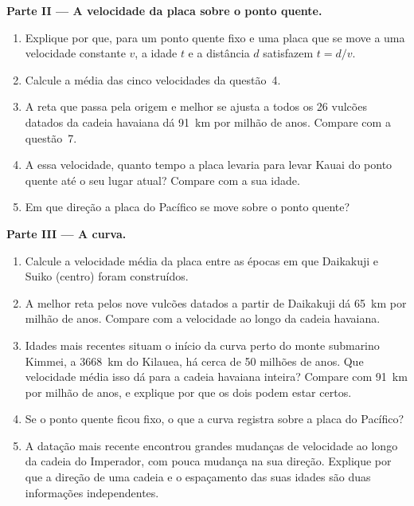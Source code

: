 \begin{problem}
\medskip
\noindent\textbf{Parte II --- A velocidade da placa sobre o ponto quente.}
\begin{enumerate}[resume]
  \item Explique por que, para um ponto quente fixo e uma placa que se move
        a uma velocidade constante $v$, a idade $t$ e a distância $d$
        satisfazem $t = d/v$.
  \item Calcule a média das cinco velocidades da questão~4.
  \item A reta que passa pela origem e melhor se ajusta a todos os 26
        vulcões datados da cadeia havaiana dá \qty{91}{km} por milhão de
        anos. Compare com a questão~7.
  \item A essa velocidade, quanto tempo a placa levaria para levar Kauai do
        ponto quente até o seu lugar atual? Compare com a sua idade.
  \item Em que direção a placa do Pacífico se move sobre o ponto quente?
\end{enumerate}

\medskip
\noindent\textbf{Parte III --- A curva.}
\begin{enumerate}[resume]
  \item Calcule a velocidade média da placa entre as épocas em que Daikakuji
        e Suiko (centro) foram construídos.
  \item A melhor reta pelos nove vulcões datados a partir de Daikakuji dá
        \qty{65}{km} por milhão de anos. Compare com a velocidade ao longo
        da cadeia havaiana.
  \item Idades mais recentes situam o início da curva perto do monte
        submarino Kimmei, a \qty{3668}{km} do Kilauea, há cerca de 50
        milhões de anos. Que velocidade média isso dá para a cadeia havaiana
        inteira? Compare com \qty{91}{km} por milhão de anos, e explique por
        que os dois podem estar certos.
  \item Se o ponto quente ficou fixo, o que a curva registra sobre a placa
        do Pacífico?
  \item A datação mais recente encontrou grandes mudanças de velocidade ao
        longo da cadeia do Imperador, com pouca mudança na sua direção.
        Explique por que a direção de uma cadeia e o espaçamento das suas
        idades são duas informações independentes.
\end{enumerate}


\end{problem}
